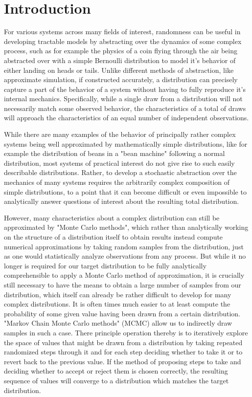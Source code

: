 \section{Introduction}

For various systems across many fields of interest, randomness can be useful in developing tractable models by abstracting over the dynamics of some complex process, such as for example the physics of a coin flying through the air being abstracted over with a simple Bernoulli distribution to model it's behavior of either landing on heads or tails. Unlike different methods of abstraction, like approximate simulation, if constructed accurately, a distribution can precisely capture a part of the behavior of a system without having to fully reproduce it's internal mechanics. Specifically, while a single draw from a distribution will not necessarily match some observed behavior, the characteristics of a total of draws will approach the characteristics of an equal number of independent observations.

While there are many examples of the behavior of principally rather complex systems being well approximated by mathematically simple distributions, like for example the distribution of beans in a "bean machine" following a normal distribution, most systems of practical interest do not give rise to such easily describable distributions. Rather, to develop a stochastic abstraction over the mechanics of many systems requires the arbitrarily complex composition of simple distributions, to a point that it can become difficult or even impossible to analytically answer questions of interest about the resulting total distribution.

However, many characteristics about a complex distribution can still be approximated by "Monte Carlo methods", which rather than analytically working on the structure of a distribution itself to obtain results instead compute numerical approximations by taking random samples from the distribution, just as one would statistically analyze observations from any process. But while it no longer is required for our target distribution to be fully analytically comprehensible to apply a Monte Carlo method of approximation, it is crucially still necessary to have the means to obtain a large number of samples from our distribution, which itself can already be rather difficult to develop for many complex distributions. It is often times much easier to at least compute the probability of some given value having been drawn from a certain distribution. "Markov Chain Monte Carlo methods" (MCMC) allow us to indirectly draw samples in such a case. There principle operation thereby is to iteratively explore the space of values that might be drawn from a distribution by taking repeated randomized steps through it and for each step deciding whether to take it or to revert back to the previous value. If the method of proposing steps to take and deciding whether to accept or reject them is chosen correctly, the resulting sequence of values will converge to a distribution which matches the target distribution.


